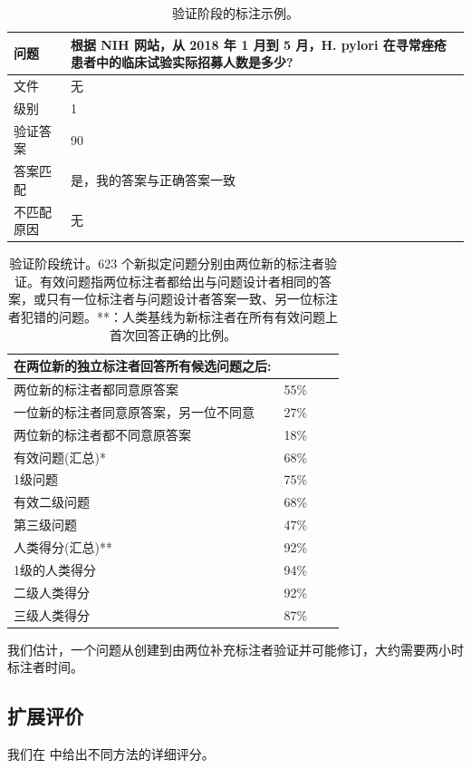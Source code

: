 \documentclass{fairmeta}
\begin{document}
\begin{table}[]
 \centering
 \small
 \begin{tabularx}{\textwidth}{lX}
 \toprule
 问题&根据 NIH 网站，从 2018 年 1 月到 5 月，H. pylori 在寻常痤疮患者中的临床试验实际招募人数是多少?\\
 \midrule
 文件&无\\
 \midrule
 级别& 1 \\
 \midrule
 验证答案& 90 \\
 \midrule
 答案匹配&是，我的答案与正确答案一致\\
 \midrule
 不匹配原因&无\\
 \bottomrule
 \end{tabularx}
 \caption{验证阶段的标注示例。}
 \label{tab:annotated_question_validation}
\end{table}


\begin{table}[]
\small
 \centering
 \begin{tabular}{lccc}
 \toprule
在两位新的独立标注者回答所有候选问题之后:& \\
 \midrule 
 两位新的标注者都同意原答案& 55\% \\
 一位新的标注者同意原答案，另一位不同意& 27\% \\
 两位新的标注者都不同意原答案& 18\% \\
 \midrule
 有效问题(汇总)*& 68\% \\
 \midrule
 1级问题& 75\% \\
 有效二级问题& 68\% \\
 第三级问题& 47\% \\
 \midrule
 人类得分(汇总)**& 92\% \\
 \midrule
 1级的人类得分& 94\% \\
 二级人类得分& 92\% \\
 三级人类得分& 87\% \\
 \bottomrule
 \end{tabular}
 \caption{验证阶段统计。623 个新拟定问题分别由两位新的标注者验证。有效问题指两位标注者都给出与问题设计者相同的答案，或只有一位标注者与问题设计者答案一致、另一位标注者犯错的问题。**：人类基线为新标注者在所有有效问题上首次回答正确的比例。}
 \label{tab:ambiguity_stats}
\end{table}

我们估计，一个问题从创建到由两位补充标注者验证并可能修订，大约需要两小时标注者时间。
\vspace{-.2cm}
\subsection{扩展评价}
\label{sec:extended_evaluation}
\vspace{-.2cm}
我们在 中给出不同方法的详细评分。
\end{document}
